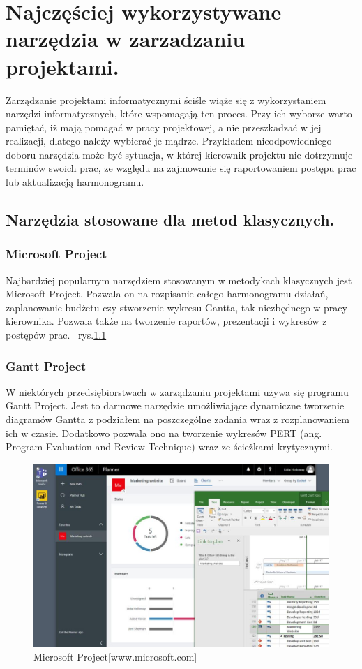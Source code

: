 
\chapter{Najczęściej wykorzystywane narzędzia w zarzadzaniu projektami.}

Zarządzanie projektami informatycznymi ściśle wiąże się z wykorzystaniem narzędzi informatycznych,
które wspomagają ten proces. Przy ich wyborze warto pamiętać, iż mają pomagać w pracy projektowej,
a nie przeszkadzać w jej realizacji, dlatego należy wybierać je mądrze.
Przykładem nieodpowiedniego doboru narzędzia może być sytuacja,
w której kierownik projektu nie dotrzymuje terminów swoich prac,
ze względu na zajmowanie się raportowaniem postępu prac lub aktualizacją harmonogramu.\cite{Kopczewski_2015}

\section{Narzędzia stosowane dla metod klasycznych.}

\subsection{Microsoft Project}

Najbardziej popularnym narzędziem stosowanym w metodykach klasycznych jest Microsoft Project.
Pozwala on na rozpisanie całego harmonogramu działań, zaplanowanie budżetu czy stworzenie wykresu Gantta,
tak niezbędnego w pracy kierownika. Pozwala także na tworzenie raportów, prezentacji i wykresów z postępów prac.
~rys.\ref{rys:project}

\subsection{Gantt Project}

W niektórych przedsiębiorstwach w zarządzaniu projektami używa się programu Gantt Project.
Jest to darmowe narzędzie umożliwiające dynamiczne tworzenie diagramów Gantta z podziałem na poszczególne zadania wraz z rozplanowaniem ich w czasie.
Dodatkowo pozwala ono na tworzenie wykresów PERT (ang. Program Evaluation and Review Technique) wraz ze ścieżkami krytycznymi.\cite{Trendy_Zarzadzanie}

\begin{figure}
	\centering\includegraphics[width=.6\textwidth]{img/Microsoft_Project}
	\caption{Microsoft Project[www.microsoft.com]}\label{rys:project}%
\end{figure}

